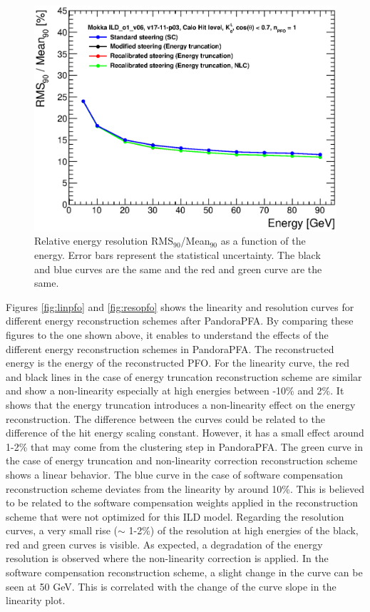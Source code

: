 \begin{figure}[htbp!]
  \centering
  \includegraphics[width=0.6\linewidth]{../Thesis_Plots/ILD/CheckCalib/Comparison_resolution_Curves_Hits.eps}
  \caption{Relative energy resolution RMS$_{90}$/Mean$_{90}$ as a function of the energy. Error bars represent the statistical uncertainty. The black and blue curves are the same and the red and green curve are the same.} \label{fig:resohits}
\end{figure}

Figures \ref{fig:linpfo} and \ref{fig:resopfo} shows the linearity and resolution curves for different energy reconstruction schemes after PandoraPFA. By comparing these figures to the one shown above, it enables to understand the effects of the different energy reconstruction schemes in PandoraPFA. The reconstructed energy is the energy of the reconstructed PFO. For the linearity curve, the red and black lines in the case of energy truncation reconstruction scheme are similar and show a non-linearity especially at high energies between -10\% and 2\%. It shows that the energy truncation introduces a non-linearity effect on the energy reconstruction. The difference between the curves could be related to the difference of the hit energy scaling constant. However, it has a small effect around 1-2\% that may come from the clustering step in PandoraPFA. The green curve in the case of energy truncation and non-linearity correction reconstruction scheme shows a linear behavior. The blue curve in the case of software compensation reconstruction scheme deviates from the linearity by around 10\%. This is believed to be related to the software compensation weights applied in the reconstruction scheme that were not optimized for this ILD model. Regarding the resolution curves, a very small rise ($\sim$ 1-2\%) of the resolution at high energies of the black, red and green curves is visible. As expected, a degradation of the energy resolution is observed where the non-linearity correction is applied. In the software compensation reconstruction scheme, a slight change in the curve can be seen at 50 GeV. This is correlated with the change of the curve slope in the linearity plot.

